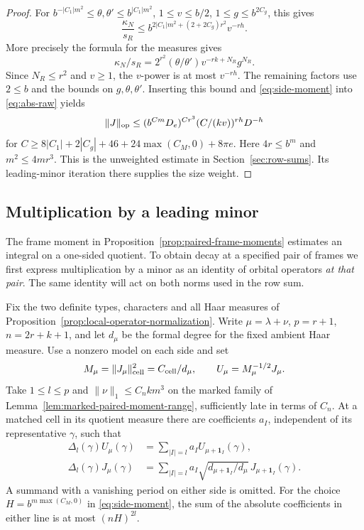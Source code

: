 \begin{proof}

For \(b^{-|C_1|m^2}\le\theta,\theta'\le b^{|C_1|m^2}\),
\(1\le v\le b/2\), \(1\le g\le b^{2C_g}\), this gives
\[
 \frac{\kappa_N}{s_R}
 \le b^{2|C_1|m^2+(2+2C_g)r^2} v^{-rh}.
\]
More precisely the formula for the measures gives
\[
  \kappa_N/s_R=2^{r^2}(\theta/\theta')v^{-rk+N_R}g^{N_R}.
\]
Since \(N_R\le r^2\) and \(v\ge1\), the \(v\)-power is at most
\(v^{-rh}\). The remaining factors use \(2\le b\) and the bounds
on \(g,\theta,\theta'\). Inserting this bound and
\eqref{eq:side-moment} into \eqref{eq:abs-raw} yields
\[
 \|J\|_{\rm op}\le (b^{Cm}D_e)^{Cr^3}
                (C/(kv))^{rh}D^{-h}
\]
for \(C\ge8|C_1|+2|C_g|+46+24\max(C_M,0)+8\pi e\).
Here \(4r\le b^m\) and \(m^2\le4mr^3\). This is the
unweighted estimate in Section~\ref{sec:row-sums}. Its
leading-minor iteration there supplies the size weight.

\end{proof}

\subsection{Multiplication by a leading minor}

The frame moment in Proposition~\ref{prop:paired-frame-moments}
estimates an integral on a one-sided quotient. To obtain decay at a
specified pair of frames we first express multiplication by a minor
as an identity of orbital operators \emph{at that pair}. The same
identity will act on both norms used in the row sum.

\begin{auxlemma}
\label{lem:minor-orbital-shift}
Fix the two definite types, characters and all Haar measures of
Proposition~\ref{prop:local-operator-normalization}. Write
\(\mu=\lambda+\nu\), \(p=r+1\), \(n=2r+k+1\), and let \(d_\mu\)
be the formal degree for the fixed ambient Haar measure. Use a nonzero
model on each side and set
\[
 M_\mu=\|J_\mu\|_{\rm cell}^2=C_{\rm cell}/d_\mu,\qquad
 U_\mu=M_\mu^{-1/2}J_\mu .
\]
Take \(1\le l\le p\) and \(\|\nu\|_1\le C_nkm^3\) on the marked
family of Lemma~\ref{lem:marked-paired-moment-range}, sufficiently
late in terms of \(C_n\). At a matched cell in its quotient measure
there are coefficients \(a_I\), independent of its representative
\(\gamma\), such that
\begin{align}
 \Delta_l(\gamma)U_\mu(\gamma)
    &=\sum_{|I|=l}a_I U_{\mu+\mathbf1_I}(\gamma),
       \label{eq:minor-shift-unit}\\
 \Delta_l(\gamma)J_\mu(\gamma)
    &=\sum_{|I|=l}a_I\sqrt{d_{\mu+\mathbf1_I}/d_\mu}\,
                       J_{\mu+\mathbf1_I}(\gamma).
       \label{eq:minor-shift-raw}
\end{align}
A summand with a vanishing period on either side is omitted.
For the choice \(H=b^{m\max(C_M,0)}\) in \eqref{eq:side-moment},
the sum of the absolute coefficients in either line is at most
\((nH)^{2l}\).
\end{auxlemma}


